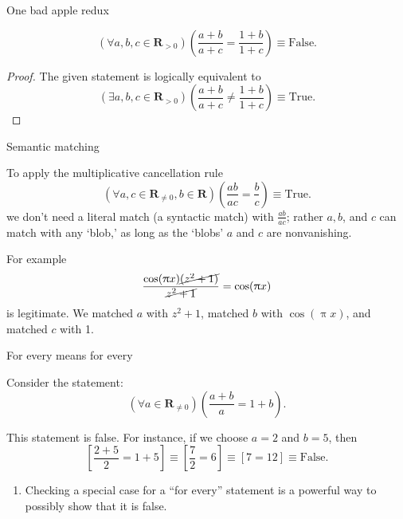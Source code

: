 \documentclass[portrait,fleqn,12pt]{beamer}
\newcommand{\reals}{\mathbf{R}}
\newenvironment{handlist}
   {\begin{enumerate}[\faHandPointRight]
       \addtolength{\itemsep}{0.0\itemsep}}
     {\end{enumerate}}
\begin{document}
\begin{frame}{One bad apple redux}
  \begin{theorem}
    \begin{equation*}
      \left(\forall  a,b,c \in \reals_{>0}\right)
         \left(\frac{a+b}{a+c} = \frac{1 + b}{1 + c} \right) \equiv \mbox{False}.
   \end{equation*}
  \end{theorem}
  \begin{proof} The given statement is logically equivalent to 
    \begin{equation*}
      \left(\exists a,b,c \in \reals_{>0}\right)
      \left(\frac{a+b}{a+c} \neq \frac{1 + b}{1 + c} \right) \equiv \mbox{True}.
    \end{equation*}
    \end{proof}
  \end{frame}


\begin{frame}{Semantic matching}

To apply the multiplicative cancellation rule
\begin{equation*} 
   \left(\forall a, c\in \reals_{\neq 0}, b \in \reals \right)\left(\frac{a b}{a c} = \frac{b}{c} \right) \equiv \text{True}.
  \end{equation*}
 we don't need a literal match (a syntactic match) with $\frac{a b}{a c}$; rather $a,b$, and $c$ can match with any `blob,'  as long as
 the `blobs'  $a$ and $c$ are nonvanishing.
 
For example
\begin{equation*}
   \frac{ \cos(\uppi x) \cancel{ (z^2 + 1)}}{ \cancel{z^2 + 1} } =  \cos(\uppi x)
\end{equation*}
is legitimate.  We matched $a$ with $z^2 + 1$,  matched $b$ with $ \cos(\uppi x) $, and matched $c$ with 1.


\end{frame}

\begin{frame}{For every means for every}

Consider the statement:
\begin{equation*}
  \left(\forall a \in \reals_{\neq 0} \right)\left(\frac{a+b}{a} = 1 + b \right).
\end{equation*}

This statement is false. For instance, if we choose $a=2$ and $b=5$, then
\begin{equation*}
    \left[ \frac{2+5}{2} = 1+5 \right] \equiv   \left[ \frac{7}{2} = 6 \right]  \equiv \left[ 7 = 12\right]  \equiv \text{False}.
\end{equation*}

\begin{handlist}
\item Checking a special case for a ``for every''  statement is a powerful way to possibly show that it is false.
\end{handlist}

\end{frame}
\end{document}
